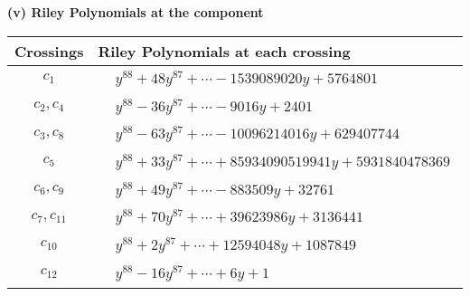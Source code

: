\documentclass[1p]{elsarticle_modified}
\theoremstyle{definition}
\begin{document}
\newpage\renewcommand{\arraystretch}{1}
\flushleft \textbf{(v) Riley Polynomials at the component}\newline \\
\begin{tabular}{m{50pt}|m{274pt}}
Crossings & \hspace{64pt}Riley Polynomials at each crossing \\
\hline $$\begin{aligned}c_{1}\end{aligned}$$&$\begin{aligned}
&y^{88}+48 y^{87}+\cdots-1539089020 y+5764801
\end{aligned}$\\
\hline $$\begin{aligned}c_{2},c_{4}\end{aligned}$$&$\begin{aligned}
&y^{88}-36 y^{87}+\cdots-9016 y+2401
\end{aligned}$\\
\hline $$\begin{aligned}c_{3},c_{8}\end{aligned}$$&$\begin{aligned}
&y^{88}-63 y^{87}+\cdots-10096214016 y+629407744
\end{aligned}$\\
\hline $$\begin{aligned}c_{5}\end{aligned}$$&$\begin{aligned}
&y^{88}+33 y^{87}+\cdots+85934090519941 y+5931840478369
\end{aligned}$\\
\hline $$\begin{aligned}c_{6},c_{9}\end{aligned}$$&$\begin{aligned}
&y^{88}+49 y^{87}+\cdots-883509 y+32761
\end{aligned}$\\
\hline $$\begin{aligned}c_{7},c_{11}\end{aligned}$$&$\begin{aligned}
&y^{88}+70 y^{87}+\cdots+39623986 y+3136441
\end{aligned}$\\
\hline $$\begin{aligned}c_{10}\end{aligned}$$&$\begin{aligned}
&y^{88}+2 y^{87}+\cdots+12594048 y+1087849
\end{aligned}$\\
\hline $$\begin{aligned}c_{12}\end{aligned}$$&$\begin{aligned}
&y^{88}-16 y^{87}+\cdots+6 y+1
\end{aligned}$\\
\hline
\end{tabular}\\~\\
\end{document}
